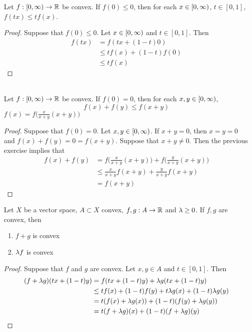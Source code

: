 \documentclass{book}
\begin{document}
	\begin{ex} 
		Let $f:[0,\infty) \rightarrow \mathbb{R}$ be convex. If $f(0) \leq 0$, then for each $x \in [0,\infty)$, $t \in [0,1]$, $f(tx) \leq tf(x)$.
	\end{ex}

	\begin{proof}
		Suppose that $f(0) \leq 0$. Let $x \in [0,\infty)$ and $t \in [0,1]$. Then 
		\begin{align*}
			f(tx)
			&= f(tx + (1-t)0) \\
			& \leq tf(x) + (1-t)f(0) \\
			& \leq tf(x)
		\end{align*}
	\end{proof}

	\begin{ex}  \\
		Let $f:[0,\infty) \rightarrow \mathbb{R}$ be convex. If $f(0) = 0$, then for each $x,y \in [0,\infty)$, $$f(x) + f(y) \leq f(x+y)$$
		 $f(x) = f \bigg( \frac{x}{x+y}(x+y)\bigg)$
	\end{ex}

	\begin{proof}
		Suppose that $f(0) = 0$. Let $x, y \in [0,\infty)$. If $x+y = 0$, then $x=y=0$ and $f(x) + f(y) = 0 = f(x+y)$. Suppose that $x+y \neq 0$. Then the previous exercise implies that 
		\begin{align*}
			f(x) + f(y) 
			&= f \bigg( \frac{x}{x+y}(x+y)\bigg) + f \bigg( \frac{y}{x+y}(x+y)\bigg) \\
			& \leq \frac{x}{x+y}f(x+y) + \frac{y}{x+y}f(x+y) \\
			&= f(x+y)
		\end{align*}
	\end{proof}
	
	\begin{ex} 
	Let $X$ be a vector space, $A \subset X$ convex, $f,g:A \rightarrow \mathbb{R}$ and $\lambda \geq 0$. If $f,g$ are convex, then 
	\begin{enumerate}
	\item $f + g$ is convex 
	\item $\lambda f$ is convex
	\end{enumerate}
	\end{ex}
	
	\begin{proof}
	Suppose that $f$ and $g$ are convex. Let $x,y \in A$ and $t \in [0,1]$. Then 
	\begin{align*}
	(f + \lambda g)(tx + (1-t)y) 
	&= f(tx + (1-t)y) + \lambda g(tx + (1-t)y) \\
	& \leq tf(x) + (1-t)f(y) +  t \lambda g(x) + (1-t)\lambda g(y) \\
	&= t(f(x) + \lambda g(x)) + (1-t)(f(y) + \lambda g(y))\\
	& = t(f + \lambda g)(x) + (1-t)(f + \lambda g)(y)
\end{align*}		 
	\end{proof}
	
\end{document}
